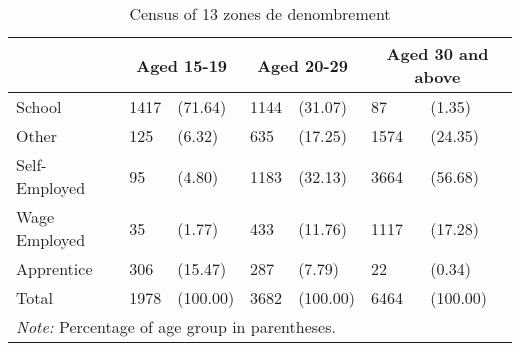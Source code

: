 \begin{table}[htbp]\centering
\def\sym#1{\ifmmode^{#1}\else\(^{#1}\)\fi}
\caption{Census of 13 zones de denombrement \label{tab:tbl-census}}
\begin{tabular}{l*{3}{ll}}
\toprule
            &\multicolumn{2}{c}{Aged 15-19}&\multicolumn{2}{c}{Aged 20-29}&\multicolumn{2}{c}{Aged 30 and above}\\
\midrule
School      &        1417&     (71.64)&        1144&     (31.07)&          87&      (1.35)\\
Other       &         125&      (6.32)&         635&     (17.25)&        1574&     (24.35)\\
Self-Employed&          95&      (4.80)&        1183&     (32.13)&        3664&     (56.68)\\
Wage Employed&          35&      (1.77)&         433&     (11.76)&        1117&     (17.28)\\
Apprentice  &         306&     (15.47)&         287&      (7.79)&          22&      (0.34)\\
Total       &        1978&    (100.00)&        3682&    (100.00)&        6464&    (100.00)\\
\bottomrule
\multicolumn{7}{l}{\footnotesize \textit{Note:} Percentage of age group in parentheses.}\\
\end{tabular}
\end{table}

